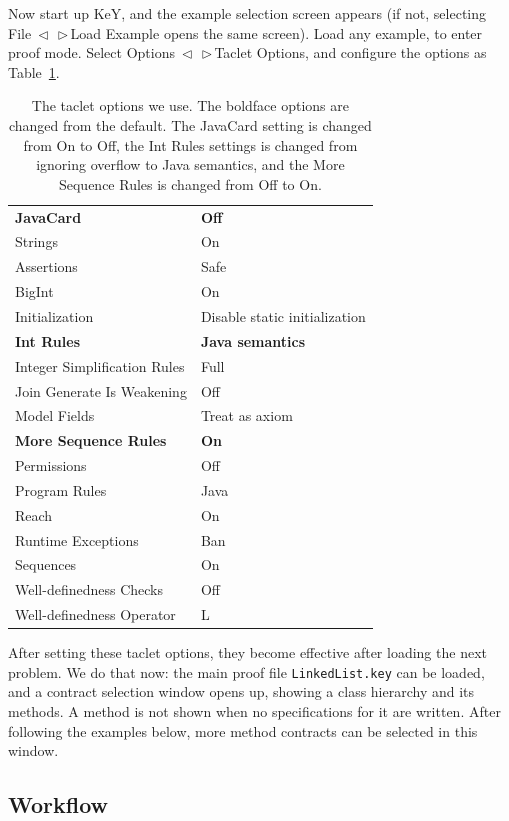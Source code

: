 \documentclass[runningheads]{llncs}
\makeatletter
\DeclareRobustCommand*{\lyxarrow}{%
\@ifstar
{\leavevmode\,$\triangleleft$\,\allowbreak}
{\leavevmode\,$\triangleright$\,\allowbreak}}
\makeatother
\begin{document}
Now start up KeY, and the example selection screen appears (if not, selecting File\lyxarrow Load Example opens the same screen). Load any example, to enter proof mode. Select Options\lyxarrow Taclet Options, and configure the options as Table~\ref{tab:taclet-options}.

\begin{table}[]
    \begin{tabular}{l@{\hskip6pt}|@{\hskip6pt}l}
    \textbf{JavaCard} & \textbf{Off} \\
    Strings & On \\
    Assertions & Safe \\
    BigInt & On \\
    Initialization & Disable static initialization \\
    \textbf{Int Rules} & \textbf{Java semantics} \\
    Integer Simplification Rules & Full \\
    Join Generate Is Weakening & Off \\
    Model Fields & Treat as axiom \\
    \textbf{More Sequence Rules} & \textbf{On} \\
    Permissions & Off \\
    Program Rules & Java \\
    Reach & On \\
    Runtime Exceptions & Ban \\
    Sequences & On \\
    Well-definedness Checks & Off \\
    Well-definedness Operator & L
    \end{tabular}
    \medskip
    \caption{The taclet options we use. The boldface options are changed from the default. The JavaCard setting is changed from On to Off, the Int Rules settings is changed from ignoring overflow to Java semantics, and the More Sequence Rules is changed from Off to On.}
    \label{tab:taclet-options}
\end{table}

After setting these taclet options, they become effective after loading the next problem. We do that now: the main proof file \texttt{LinkedList.key} can be loaded, and a contract selection window opens up, showing a class hierarchy and its methods. A method is not shown when no specifications for it are written. After following the examples below, more method contracts can be selected in this window.

\subsection{Workflow}
\end{document}
